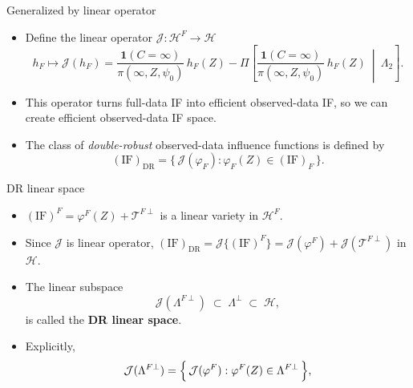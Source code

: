 \documentclass[xcolor=dvipsnames,aspectratio=169]{beamer}
\newcommand{\1}{\mathbbm{1}}
\begin{document}
\begin{frame}{Generalized by linear operator}
    \begin{tcolorbox}[colframe=red,title=Definition 1]
    \begin{itemize}
      \item Define the linear operator $\mathcal{J}:\mathcal{H}^F\to\mathcal{H}$
      \[
        h_F \mapsto 
        \mathcal{J}
        (h_F) =
        \frac{\mathbf{1}(C=\infty)}{\pi(\infty,Z,\psi_0)}\,h_F(Z)
        - \Pi\!\left[
          \frac{\mathbf{1}(C=\infty)}{\pi(\infty,Z,\psi_0)}\,h_F(Z)
          \ \middle|\ \Lambda_2
        \right].
      \]
    \end{itemize}
  \end{tcolorbox}
  \begin{itemize}
    \item This operator turns full-data IF into efficient observed-data IF, so we can create efficient observed-data IF space.
  \end{itemize}
  \begin{tcolorbox}[colframe=red,title=Definition 2]
    \begin{itemize}
      \item The class of \emph{double-robust} observed-data influence functions is defined by
      \[
        (\mathrm{IF})_{\mathrm{DR}}
        =
        \big\{\, \mathcal{J}(\varphi_F): \varphi_F(Z)\in(\mathrm{IF})_F \,\big\}.
      \]
    \end{itemize}
  \end{tcolorbox}
\end{frame}

\begin{frame}{DR linear space}
    \begin{itemize}
      \item $(\mathrm{IF})^F=\varphi^F(Z)+\mathcal{T}^{F\perp}$ is a linear variety in $\mathcal{H}^F$.
      \item Since $\mathcal{J}$ is \alert{linear} operator, $(\mathrm{IF})_{\mathrm{DR}}=\mathcal{J}\{(\mathrm{IF})^F\}=\mathcal{J}(\varphi^F)+\mathcal{J}(\mathcal{T}^{F\perp})$ in $\mathcal{H}$.
    \end{itemize}
    \begin{tcolorbox}[colframe=red,title=Definition 3]
    \begin{itemize}
      \item The linear subspace
      \[
        \mathcal{J}(\Lambda^{F\perp}) \;\subset\; \Lambda^{\perp} \;\subset\; \mathcal{H},
      \]
      is called the \textbf{DR linear space}.
      \item Explicitly,
      \[
        \mathcal{J}(\Lambda^{F\perp})
        =
        \Bigl\{\, \mathcal{J}(\varphi^{F}) : \varphi^{F}(Z)\in\Lambda^{F\perp} \,\Bigr\},
      \]
    \end{itemize}
  \end{tcolorbox}
\end{frame}
\end{document}
